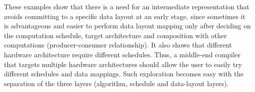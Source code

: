 {%

These examples show that there is a need for an intermediate representation that avoids committing to a specific data layout at an early stage, since sometimes it is advantageous and easier to perform data layout mapping only after deciding on the computation schedule, target architecture and composition with other computations (producer-consumer relationship).  It also shows that different hardware architecture require different schedules. Thus, a middle-end compiler that targets multiple hardware architectures should allow the user to easily try different schedules and data mappings.  Such exploration becomes easy with the separation of the three layers (algorithm, schedule and data-layout layers).

}

